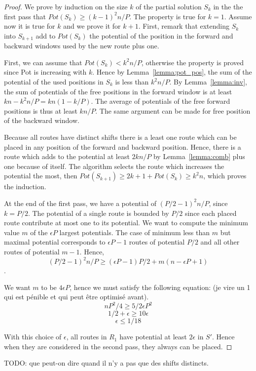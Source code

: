 \documentclass[10pt, conference, letterpaper]{IEEEtran}
\begin{document}
\begin{proof}
We prove by induction on the size $k$ of the partial solution $S_k$ in the the first pass that 
$Pot(S_k) \geq (k-1)^2n/P$. 
The property is true for $k=1$. Assume now it is true for $k$ and we prove it for $k+1$.
First, remark that extending $S_k$ into $S_{k+1}$ add to $Pot(S_k)$ the potential of the position in the forward and backward windows used by the new route plus one.

First, we can assume that $Pot(S_k) < k^2n/P$, otherwise the property is proved since Pot is increasing
with $k$. Hence by Lemma~\ref{lemma:pot_pos}, the sum of the potential of the used positions in $S_{k}$ 
is less than $k^2n/P$. By Lemma~\ref{lemma:inv}, the sum of potentials of the free positions in the 
forward window is at least $kn - k^2n/P = kn(1 - k/P)$. The average of potentials of the free forward positions is thus at least $kn/P$. The same argument can be made for free position of the backward window. 

Because all routes have distinct shifts there is a least one route which can be placed in any position
of the forward and backward position. Hence, there is a route which adds to the potential at least
$2kn/P$ by Lemma~\ref{lemma:comb} plus one because of itself. The algorithm selects the route which increases the potential the most, then $Pot(S_{k+1}) \geq 2k+1 + Pot(S_k) \geq k^2n$, which proves the induction.

At the end of the first pass, we have a potential of $(P/2-1)^2n/P$, since $k=P/2$.
The potential of a single route is bounded by $P/2$ since each placed route contribute at most one to its potential. We want to compute the minimum value $m$ of the $\epsilon P$ largest potentials. The case of minimum
less than $m$ but maximal potential corresponds to $\epsilon P -1$ routes of potential $P/2$ and all other routes of potential $m-1$. Hence, $$(P/2-1)^2n/P \geq  (\epsilon P -1)P/2 + m(n-\epsilon P + 1)$$.

We want $m$ to be $4\epsilon P$, hence we must satisfy the following equation:
(je vire un 1 qui est pénible et qui peut être optimisé avant).
$$ nP^2/4\geq 5/2 \epsilon P^2$$
$$ 1/2 + \epsilon \geq 10\epsilon$$
$$ \epsilon \leq 1/18$$

With this choice of $\epsilon$, all routes in $R_1$
have potential at least $2\epsilon$ in $S'$. Hence when they are considered in the 
second pass, they always can be placed.

\end{proof}
TODO: que peut-on dire quand il n'y a pas que des shifts distincts.
\end{document}
